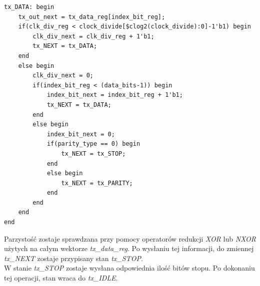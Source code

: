 \documentclass[11pt,a4paper]{article}
\begin{document}
\begin{minipage}{\textwidth}
\begin{scriptsize}
\begin{lstlisting}[label=Lis:uart_tx_data,caption=Stan \textit{tx\_DATA}]
tx_DATA: begin
	tx_out_next = tx_data_reg[index_bit_reg];
	if(clk_div_reg < clock_divide[$clog2(clock_divide):0]-1'b1) begin
		clk_div_next = clk_div_reg + 1'b1;
		tx_NEXT = tx_DATA;
	end
	else begin
		clk_div_next = 0;
		if(index_bit_reg < (data_bits-1)) begin
			index_bit_next = index_bit_reg + 1'b1;
			tx_NEXT = tx_DATA;
		end
		else begin
			index_bit_next = 0;
			if(parity_type == 0) begin
				tx_NEXT = tx_STOP;
			end
			else begin
				tx_NEXT = tx_PARITY;
			end
		end
	end
end
\end{lstlisting}
\end{scriptsize}
\end{minipage}
Parzystość zostaje sprawdzana przy pomocy operatorów redukcji \textit{XOR} lub \textit{NXOR} użytych na całym wektorze \textit{tx\_data\_reg}. Po wysłaniu tej informacji, do zmiennej \textit{tx\_NEXT} zostaje przypisany stan \textit{tx\_STOP}.\\
W stanie \textit{tx\_STOP} zostaje wysłana odpowiednia ilość bitów stopu. Po dokonaniu tej operacji, stan wraca do \textit{tx\_IDLE}.
\end{document}
